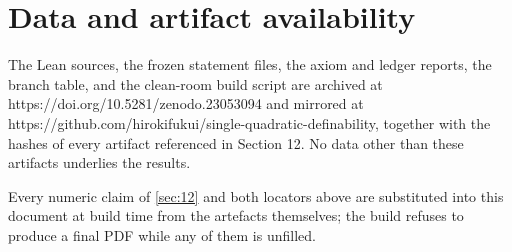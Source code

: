 \section*{Data and artifact availability}
The Lean sources, the frozen statement files, the axiom and ledger reports, the branch table, and the clean-room build script are archived at https://doi.org/10.5281/zenodo.23053094 and mirrored at https://github.com/hirokifukui/single-quadratic-definability, together with the hashes of every artifact referenced in Section 12. No data other than these artifacts underlies the results.

Every numeric claim of \cref{sec:12} and both locators above are substituted into this document at build time from the artefacts themselves; the build refuses to produce a final PDF while any of them is unfilled.

\appendix
